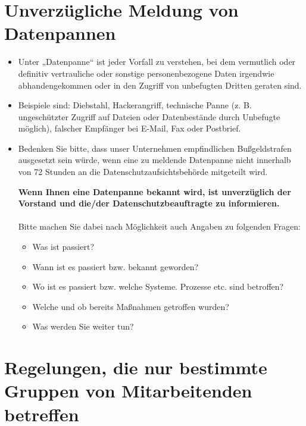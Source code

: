 \documentclass[a4paper, fontsize=11pt]{scrartcl}
\begin{document}
\section{Unverzügliche Meldung von Datenpannen}
\begin{itemize}
  \item Unter „Datenpanne“ ist jeder Vorfall zu verstehen, bei dem vermutlich oder definitiv vertrauliche oder sonstige personenbezogene Daten irgendwie abhandengekommen oder in den Zugriff von unbefugten Dritten geraten sind.
  \item Beispiele sind: Diebstahl, Hackerangriff, technische Panne (z. B. ungeschützter Zugriff auf Dateien oder Datenbestände durch Unbefugte möglich), falscher Empfänger bei E-Mail, Fax oder Postbrief.
  \item Bedenken Sie bitte, dass unser Unternehmen empfindlichen Bußgeldstrafen ausgesetzt sein würde, wenn eine zu meldende Datenpanne nicht innerhalb von 72 Stunden an die Datenschutzaufsichtsbehörde mitgeteilt wird.
  
  {\large\textbf{Wenn Ihnen eine Datenpanne bekannt wird, ist unverzüglich der Vorstand und die/der Datenschutzbeauftragte zu informieren.}} \\ \\
  Bitte machen Sie dabei nach Möglichkeit auch Angaben zu folgenden Fragen:
  \begin{itemize}
    \item Was ist passiert?
    \item Wann ist es passiert bzw. bekannt geworden?
    \item Wo ist es passiert bzw. welche Systeme. Prozesse etc. sind betroffen?
    \item Welche und ob bereits Maßnahmen getroffen wurden?
    \item Was werden Sie weiter tun?
  \end{itemize}
\end{itemize}

\section{Regelungen, die nur bestimmte Gruppen von Mitarbeitenden betreffen}
\end{document}
